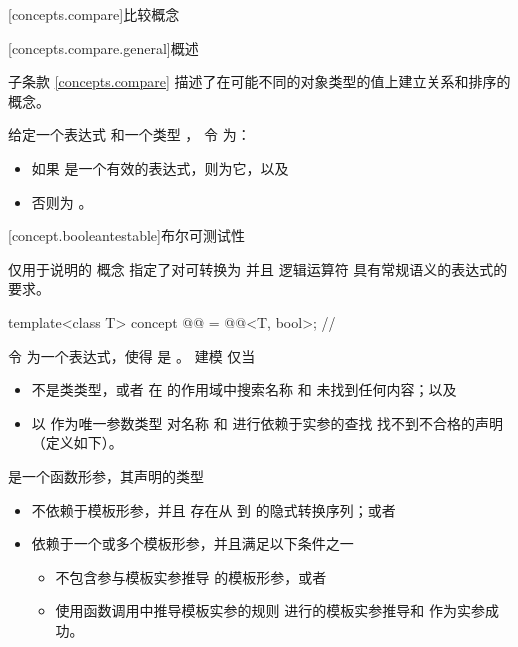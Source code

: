 [concepts.compare]{比较概念}

[concepts.compare.general]{概述}

\pnum
子条款 \ref{concepts.compare} 描述了在可能不同的对象类型的值上建立关系和排序的概念。

\pnum
给定一个表达式  和一个类型 ，
令  为：
\begin{itemize}
\item
如果  是一个有效的表达式，则为它，以及
\item
否则为 。
\end{itemize}

[concept.booleantestable]{布尔可测试性}

\pnum
仅用于说明的  概念
指定了对可转换为  并且
逻辑运算符
具有常规语义的表达式的要求。

\begin{itemdecl}
template<class T>
concept @@ = @@<T, bool>;  // \expos
\end{itemdecl}

\pnum
令  为一个表达式，使得
 是 。
 建模  仅当

\begin{itemize}
\item
{} 不是类类型，或者
在  的作用域中搜索名称  和 
未找到任何内容；以及

\item
以  作为唯一参数类型
对名称  和  进行依赖于实参的查找
找不到不合格的声明（定义如下）。
\end{itemize}

\pnum
{}
是一个函数形参，其声明的类型 

\begin{itemize}
\item
不依赖于模板形参，并且
存在从  到  的隐式转换序列；或者

\item
依赖于一个或多个模板形参，并且满足以下条件之一
\begin{itemize}
\item
{} 不包含参与模板实参推导 的模板形参，或者
\item
使用函数调用中推导模板实参的规则 进行的模板实参推导和
 作为实参成功。
\end{itemize}
\end{itemize}

